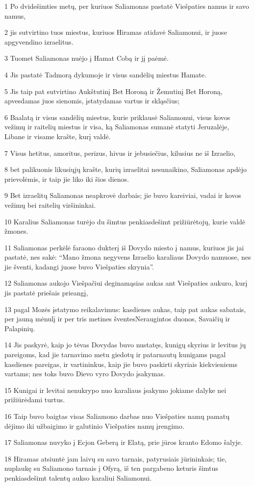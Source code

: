 \par 1 Po dvidešimties metų, per kuriuos Saliamonas pastatė Viešpaties namus ir savo namus, 
\par 2 jis sutvirtino tuos miestus, kuriuos Hiramas atidavė Saliamonui, ir juose apgyvendino izraelitus. 
\par 3 Tuomet Saliamonas nuėjo į Hamat Cobą ir jį paėmė. 
\par 4 Jis pastatė Tadmorą dykumoje ir visus sandėlių miestus Hamate. 
\par 5 Jis taip pat sutvirtino Aukštutinį Bet Horoną ir Žemutinį Bet Horoną, apvesdamas juos sienomis, įstatydamas vartus ir skląsčius; 
\par 6 Baalatą ir visus sandėlių miestus, kurie priklausė Saliamonui, visus kovos vežimų ir raitelių miestus ir visa, ką Saliamonas sumanė statyti Jeruzalėje, Libane ir visame krašte, kurį valdė. 
\par 7 Visus hetitus, amoritus, perizus, hivus ir jebusiečius, kilusius ne iš Izraelio, 
\par 8 bet palikuonis likusiųjų krašte, kurių izraelitai nesunaikino, Saliamonas apdėjo prievolėmis, ir taip jie liko iki šios dienos. 
\par 9 Bet izraelitų Saliamonas neapkrovė darbais; jie buvo kareiviai, vadai ir kovos vežimų bei raitelių viršininkai. 
\par 10 Karalius Saliamonas turėjo du šimtus penkiasdešimt prižiūrėtojų, kurie valdė žmones. 
\par 11 Saliamonas perkėlė faraono dukterį iš Dovydo miesto į namus, kuriuos jis jai pastatė, nes sakė: “Mano žmona negyvens Izraelio karaliaus Dovydo namuose, nes jie šventi, kadangi juose buvo Viešpaties skrynia”. 
\par 12 Saliamonas aukojo Viešpačiui deginamąsias aukas ant Viešpaties aukuro, kurį jis pastatė priešais prieangį, 
\par 13 pagal Mozės įstatymo reikalavimus: kasdienes aukas, taip pat aukas sabatais, per jauną mėnulį ir per tris metines šventes­Neraugintos duonos, Savaičių ir Palapinių. 
\par 14 Jis paskyrė, kaip jo tėvas Dovydas buvo nustatęs, kunigų skyrius ir levitus jų pareigoms, kad jie tarnavimo metu giedotų ir patarnautų kunigams pagal kasdienes pareigas, ir vartininkus, kaip jie buvo paskirti skyriais kiekvieniems vartams; nes toks buvo Dievo vyro Dovydo įsakymas. 
\par 15 Kunigai ir levitai nenukrypo nuo karaliaus įsakymo jokiame dalyke nei prižiūrėdami turtus. 
\par 16 Taip buvo baigtas visas Saliamono darbas nuo Viešpaties namų pamatų dėjimo iki užbaigimo ir galutinio Viešpaties namų įrengimo. 
\par 17 Saliamonas nuvyko į Ecjon Geberą ir Elatą, prie jūros kranto Edomo šalyje. 
\par 18 Hiramas atsiuntė jam laivų su savo tarnais, patyrusiais jūrininkais; tie, nuplaukę su Saliamono tarnais į Ofyrą, iš ten pargabeno keturis šimtus penkiasdešimt talentų aukso karaliui Saliamonui.




